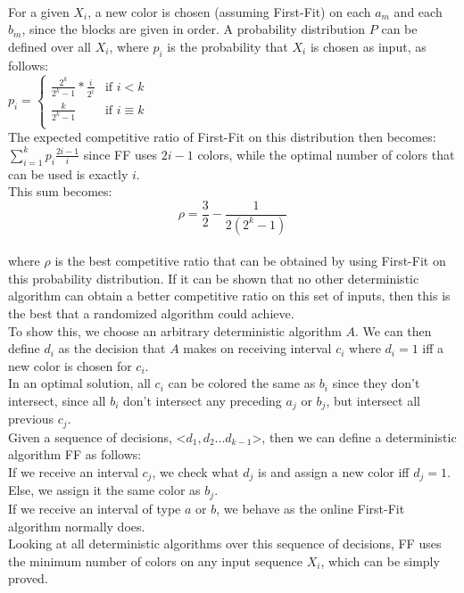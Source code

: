\\For a given $X_i$, a new color is chosen (assuming First-Fit) on each $a_m$ and each $b_m$, since the blocks are given in order. A probability distribution $P$ can be defined over all $X_i$, where $p_i$ is the probability that $X_i$ is chosen as input, as follows:
\\$p_i = \begin{cases} \frac{2^k}{2^k-1}*\frac{i}{2^i} &\mbox{if } i < k \\ 
\frac{k}{2^k-1} & \mbox{if } i \equiv k \\ \end{cases}$
\\The expected competitive ratio of First-Fit on this distribution then becomes:
\\$\sum_{i=1}^k p_i\frac{2i-1}{i}$ since FF uses $2i-1$ colors, while the optimal number of colors that can be used is exactly $i$.
\\This sum becomes:
\begin{equation*}
\rho = \frac{3}{2} - \frac{1}{2(2^k-1)}
\end{equation*}
\\where $\rho$ is the best competitive ratio that can be obtained by using First-Fit on this probability distribution. If it can be shown that no other deterministic algorithm can obtain a better competitive ratio on this set of inputs, then this is the best that a randomized algorithm could achieve.
\\To show this, we choose an arbitrary deterministic algorithm $A$. We can then define $d_i$ as the decision that $A$ makes on receiving interval $c_i$ where $d_i = 1$ iff a new color is chosen for $c_i$.
\\In an optimal solution, all $c_i$ can be colored the same as $b_i$ since they don't intersect, since all $b_i$ don't intersect any preceding $a_j$ or $b_j$, but intersect all previous $c_j$.
\\Given a sequence of decisions, <$d_1, d_2...d_{k-1}$>, then we can define a deterministic algorithm FF as follows:
\\If we receive an interval $c_j$, we check what $d_j$ is and assign a new color iff $d_j = 1$. Else, we assign it the same color as $b_j$. 
\\If we receive an interval of type $a$ or $b$, we behave as the online First-Fit algorithm normally does.
\\Looking at all deterministic algorithms over this sequence of decisions, FF uses the minimum number of colors on any input sequence $X_i$, which  can be simply proved.
